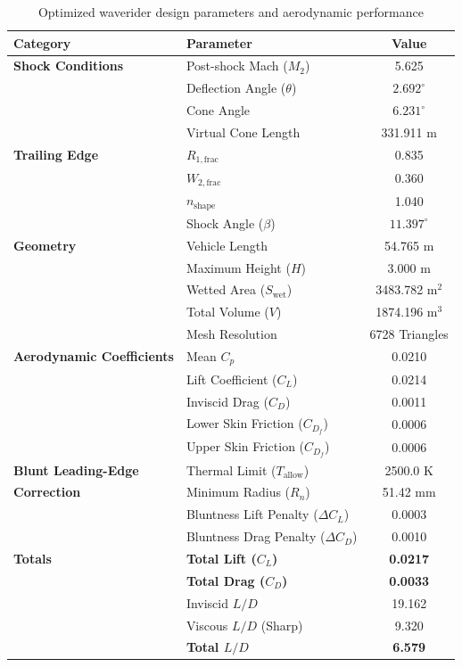 \documentclass[10pt,a4paper]{article}
\begin{document}
\begin{table}[htbp!]
    \centering
    \caption{Optimized waverider design parameters and aerodynamic performance}
    \label{tab:optimized_results}
    \begin{tabular}{@{}llc@{}}
        \toprule
        \textbf{Category} & \textbf{Parameter} & \textbf{Value} \\
        \midrule
        \textbf{Shock Conditions} 
        & Post-shock Mach ($M_2$) & 5.625 \\
        & Deflection Angle ($\theta$) & $2.692^\circ$ \\
        & Cone Angle & $6.231^\circ$ \\
        & Virtual Cone Length & 331.911 m \\
        \midrule
        \textbf{Trailing Edge} 
        & $R_{1, \text{frac}}$ & 0.835 \\
        & $W_{2, \text{frac}}$ & 0.360 \\
        & $n_{\text{shape}}$ & 1.040 \\
        & Shock Angle ($\beta$) & $11.397^\circ$ \\
        \midrule
        \textbf{Geometry} 
        & Vehicle Length & 54.765 m \\
        & Maximum Height ($H$) & 3.000 m \\
        & Wetted Area ($S_{\text{wet}}$) & 3483.782 m$^2$ \\
        & Total Volume ($V$) & 1874.196 m$^3$ \\
        & Mesh Resolution & 6728 Triangles \\
        \midrule
        \textbf{Aerodynamic Coefficients} 
        & Mean $C_p$ & 0.0210 \\
        & Lift Coefficient ($C_L$) & 0.0214 \\
        & Inviscid Drag ($C_D$) & 0.0011 \\
        & Lower Skin Friction ($C_{D_f}$) & 0.0006 \\
        & Upper Skin Friction ($C_{D_f}$) & 0.0006 \\
        \midrule
        \textbf{Blunt Leading-Edge} 
        & Thermal Limit ($T_{\text{allow}}$) & 2500.0 K \\
        \textbf{Correction} & Minimum Radius ($R_n$) & 51.42 mm \\
        & Bluntness Lift Penalty ($\Delta C_L$) & 0.0003 \\
        & Bluntness Drag Penalty ($\Delta C_D$) & 0.0010 \\
        \midrule
        \textbf{Totals} 
        & \textbf{Total Lift ($C_L$)} & \textbf{0.0217} \\
        & \textbf{Total Drag ($C_D$)} & \textbf{0.0033} \\
        & Inviscid $L/D$ & 19.162 \\
        & Viscous $L/D$ (Sharp) & 9.320 \\
        & \textbf{Total $L/D$} & \textbf{6.579} \\
        \bottomrule
    \end{tabular}
\end{table}
\end{document}
